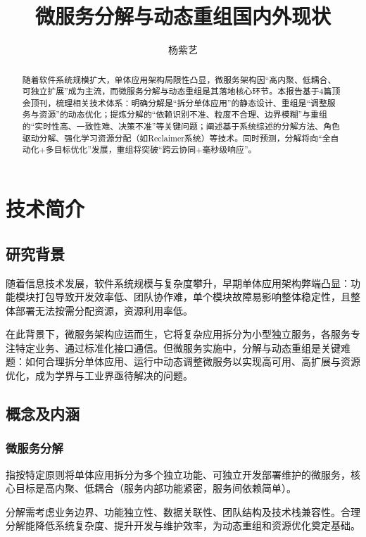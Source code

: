 \documentclass[lang=cn,11pt,a4paper,cite=number]{elegantpaper}
\title{微服务分解与动态重组国内外现状}
\author{杨紫艺}
\date{\zhtoday}
\begin{document}
\maketitle

\tableofcontents

\newpage

\begin{abstract}
随着软件系统规模扩大，单体应用架构局限性凸显，微服务架构因“高内聚、低耦合、可独立扩展”成为主流，而微服务分解与动态重组是其落地核心环节。本报告基于4篇顶会顶刊，梳理相关技术体系：明确分解是“拆分单体应用”的静态设计、重组是“调整服务与资源”的动态优化；提炼分解的“依赖识别不准、粒度不合理、边界模糊”与重组的“实时性高、一致性难、决策不准”等关键问题；阐述基于系统综述的分解方法、角色驱动分解、强化学习资源分配（如Reclaimer系统）等技术。同时预测，分解将向“全自动化+多目标优化”发展，重组将突破“跨云协同+毫秒级响应”。
\end{abstract}

\newpage

\section{技术简介}
\subsection{研究背景}
\label{sec:x1-1}
随着信息技术发展，软件系统规模与复杂度攀升，早期单体应用架构弊端凸显：功能模块打包导致开发效率低、团队协作难，单个模块故障易影响整体稳定性，且整体部署无法按需分配资源，资源利用率低。\par
在此背景下，微服务架构应运而生，它将复杂应用拆分为小型独立服务，各服务专注特定业务、通过标准化接口通信。但微服务实施中，分解与动态重组是关键难题：如何合理拆分单体应用、运行中动态调整微服务以实现高可用、高扩展与资源优化，成为学界与工业界亟待解决的问题。
\subsection{概念及内涵}
\subsubsection{微服务分解}
\label{sec:x1-1-1}
指按特定原则将单体应用拆分为多个独立功能、可独立开发部署维护的微服务，核心目标是高内聚、低耦合（服务内部功能紧密，服务间依赖简单）。\par
分解需考虑业务边界、功能独立性、数据关联性、团队结构及技术栈兼容性。合理分解能降低系统复杂度、提升开发与维护效率，为动态重组和资源优化奠定基础。
\end{document}
